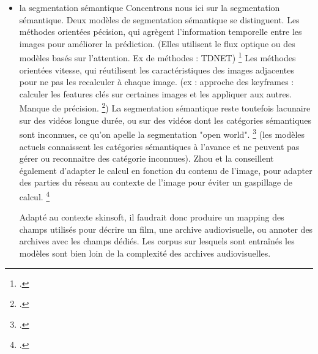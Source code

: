 \begin{itemize}
Enfin, peut être appliquée à une vidéo une segmentation de la bande sonore, qu'on désignera sous le nom de segmentation audio, utilisée par exemple, pour segmenter les paroles de la musique das une même séquence vidéo. \footcite{carrive2014}




\item la segmentation sémantique 
Concentrons nous ici sur la segmentation sémantique. Deux modèles de segmentation sémantique se distinguent. Les méthodes orientées pécision, qui agrègent l'information temporelle entre les images pour améliorer la prédiction. (Elles utilisent le flux optique ou des modèles basés sur l'attention. Ex de méthodes : TDNET) \footcite{zhou2022}
Les méthodes orientées vitesse, qui réutilisent les caractéristiques des images adjacentes pour ne pas les recalculer à chaque image. (ex : approche des keyframes : calculer les features clés sur certaines images et les appliquer aux autres. Manque de précision. \footcite{zhou2022})
La segmentation sémantique reste toutefois lacunaire sur des vidéos longue durée, ou sur des vidéos dont les catégories sémantiques sont inconnues, ce qu'on apelle la segmentation "open world". \footcite{zhou2022} (les modèles actuels connaissent les catégories sémantiques à l'avance et ne peuvent pas gérer ou reconnaitre des catégorie inconnues). Zhou et la conseillent également d'adapter le calcul en fonction du contenu de l'image, pour adapter des parties du réseau au contexte de l'image pour éviter un gaspillage de calcul. \footcite{zhou2022} 

Adapté au contexte skinsoft, il faudrait donc produire un mapping des champs utilisés pour décrire un film, une archive audiovisuelle, ou annoter des archives avec les champs dédiés. Les corpus sur lesquels sont entraînés les modèles sont bien loin de la complexité des archives audiovisuelles. 







\end{itemize}
